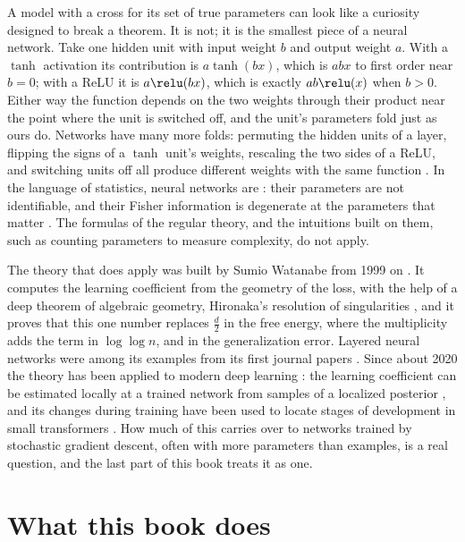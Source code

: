\begin{refsection}
A model with a cross for its set of true parameters can look like a curiosity designed to break a theorem. It is not; it is the smallest piece of a neural network. Take one hidden unit with input weight $b$ and output weight $a$. With a $\tanh$ activation its contribution is $a\tanh(bx)$, which is $abx$ to first order near $b=0$; with a ReLU it is $a\relu(bx)$, which is exactly $ab\relu(x)$ when $b>0$. Either way the function depends on the two weights through their product near the point where the unit is switched off, and the unit's parameters fold just as ours do. Networks have many more folds: permuting the hidden units of a layer, flipping the signs of a $\tanh$ unit's weights, rescaling the two sides of a ReLU, and switching units off all produce different weights with the same function \parencite{Sussmann1992,FukumizuAmari2000,DinhEtAl2017}. In the language of statistics, neural networks are : their parameters are not identifiable, and their Fisher information is degenerate at the parameters that matter \parencite{Watanabe2009,WeiEtAl2023}. The formulas of the regular theory, and the intuitions built on them, such as counting parameters to measure complexity, do not apply.

The theory that does apply was built by Sumio Watanabe from 1999 on \parencite{Watanabe1999,Watanabe2001a,Watanabe2009,Watanabe2018}. It computes the learning coefficient from the geometry of the loss, with the help of a deep theorem of algebraic geometry, Hironaka's resolution of singularities \parencite{Hironaka1964a,Hironaka1964b}, and it proves that this one number replaces $\tfrac d2$ in the free energy, where the multiplicity adds the term in $\log\log n$, and in the generalization error. Layered neural networks were among its examples from its first journal papers \parencite{Watanabe2001a,Watanabe2001b}. Since about 2020 the theory has been applied to modern deep learning \parencite{WeiEtAl2023}: the learning coefficient can be estimated locally at a trained network from samples of a localized posterior \parencite{LauEtAl2025}, and its changes during training have been used to locate stages of development in small transformers \parencite{HooglandEtAl2025}. How much of this carries over to networks trained by stochastic gradient descent, often with more parameters than examples, is a real question, and the last part of this book treats it as one.

\section*{What this book does}


\end{refsection}
